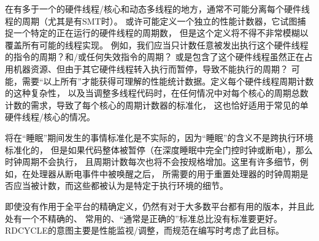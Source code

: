\begin{commentary}
在有多于一个的硬件线程/核心和动态多线程的地方，通常不可能分离每个硬件线程的周期（尤其是有SMT时）。
或许可能定义一个独立的性能计数器，它试图捕捉一个特定的正在运行的硬件线程的周期数，
但是这个定义将不得不非常模糊以覆盖所有可能的线程实现。
例如，我们应当只计数任意被发出执行这个硬件线程的指令的周期？和/或任何失效指令的周期？
或是包含了这个硬件线程虽然正在占用机器资源、但由于其它硬件线程转入执行而暂停，导致不能执行的周期？
可能，需要“以上所有”才能获得可理解的性能统计数据。定义每个硬件线程周期计数的这种复杂性，
以及当调整多线程代码时，在任何情况中对每个核心的周期总数计数的需求，导致了每个核心的周期计数器的标准化，
这也恰好适用于常见的单硬件线程/核心的情况。

将在“睡眠”期间发生的事情标准化是不实际的，因为“睡眠”的含义不是跨执行环境标准化的，
但是如果代码整体被暂停（在深度睡眠中完全门控时钟或断电），那么时钟周期不会执行，
且周期计数每次也将不会按规格增加。这里有许多细节，例如，在处理器从断电事件中被唤醒之后，
所需要的用于重置处理器的时钟周期是否应当被计数，而这些都被认为是特定于执行环境的细节。

即使没有作用于全平台的精确定义，仍然有对于大多数平台都有用的版本，并且此处有一个不精确的、
常用的、“通常是正确的”标准总比没有标准要更好。RDCYCLE的意图主要是性能监视/调整，而规范在编写时考虑了此目标。
\end{commentary}

